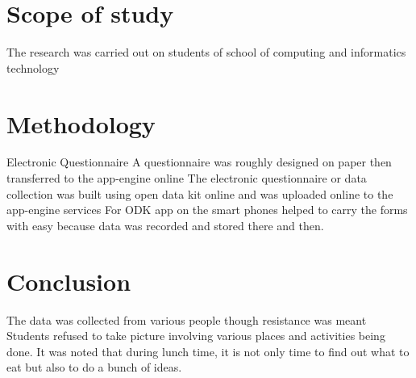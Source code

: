 \documentclass[12pt,a4paper]{article}
\begin{document}
\section{Scope of study}
The research was carried out on students of school of computing and informatics technology

\section{Methodology}
Electronic Questionnaire
A questionnaire was roughly designed on paper then transferred to the app-engine online
The electronic questionnaire or data collection was built using open data kit online and was uploaded online to the app-engine services
For ODK app on the smart phones helped to carry the forms with easy because data was recorded and stored there and then.

\section{Conclusion}
The data was collected from various people though resistance was meant
Students refused to take picture involving various places and activities being done.
It was noted that during lunch time, it is not only time to find out what to eat but also to do a bunch of ideas.
\end{document}
